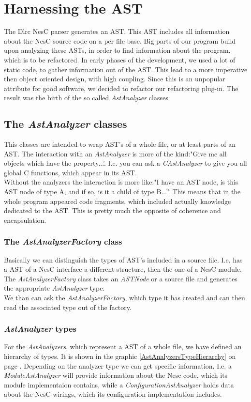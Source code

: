 \documentclass[a4paper,10pt]{report}
\begin{document}
\chapter{Harnessing the AST}
\label{harnessingTheAST}
The Dlrc NesC parser generates an AST. This AST includes all information about the NesC source code on a per file base.
Big parts of our program build upon analyzing these ASTs, in order to find information about the program, which is to be refactored.
In early phases of the development, we used a lot of static code, to gather information out of the AST.
This lead to a more imperative then object oriented design, with high coupling.
Since this is an unpopular attribute for good software, we decided to refactor our refactoring plug-in. 
The result was the birth of the so called {\it AstAnalyzer} classes.

\section{The {\it AstAnalyzer} classes}
\label{AstAnalyzerClasses}
This classes are intended to wrap AST's of a whole file, or at least parts of an AST.
The interaction with an {\it AstAnalyzer} is more of the kind:"Give me all objects which have the property...'.
I.e. you can ask a {\it CAstAnalyzer} to give you all global C functions, which appear in its AST.\\
Without the analyzers the interaction is more like:"I have an AST node, is this AST node of type A, and if so, is it a child of type B...''.
This means that in the whole program appeared code fragments, which included actually knowledge dedicated to the AST.
This is pretty much the opposite of coherence and encapsulation.

\subsection{The {\it AstAnalyzerFactory} class}
Basically we can distinguish the types of AST's included in a source file. I.e. has a AST of a NesC interface a different structure, then the one of a NesC module.
The {\it AstAnalyzerFactory} class takes an {\it ASTNode} or a source file and generates the appropriate {\it AstAnalyzer} type.\\
We than can ask the {\it AstAnalyzerFactory}, which type it has created and can then read the associated type out of the factory.

\subsection{{\it AstAnalyzer} types}
For the {\it AstAnalyzers}, which represent a AST of a whole file, we have defined an hierarchy of types.
It is shown in the graphic \ref{AstAnalyzersTypeHierarchy} on page \pageref{AstAnalyzersTypeHierarchy}.
Depending on the analyzer type we can get specific information. 
I.e. a {\it ModuleAstAnalyzer} will provide information about the Nesc code, which its module implementaion contains,
while a {\it ConfigurationAstAnalyzer} holds data about the NesC wirings, which its configuration implementation includes.
\end{document}
